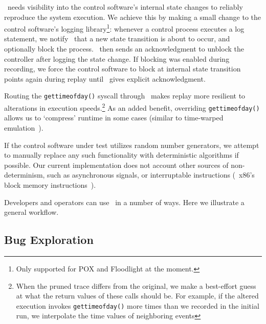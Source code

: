 \projectname~needs visibility into the control software's internal state
changes to reliably reproduce the system execution. We achieve this by
making a
small change to the control software's logging library\footnote{Only supported
for POX and Floodlight at the moment.}: whenever a control process executes a log
statement, we notify \projectname~that a new state transition
is about to occur, and optionally block the process. \projectname~then sends
an acknowledgment to unblock the controller after logging the state change. If blocking was enabled
during recording, we force the control software to block at internal state
transition points again during replay
until \projectname~gives explicit acknowledgment.

Routing the {\tt gettimeofday()} syscall
through \projectname~makes replay more resilient to alterations in execution
speeds.\footnote{When the pruned trace differs from the original, we make a
best-effort guess at what the return values of these calls should be. For example,
if the altered execution invokes {\tt gettimeofday()} more times than we recorded
in the initial run, we interpolate the time values of neighboring events}
As an added benefit, overriding {\tt gettimeofday()} allows us to `compress'
runtime in some cases (similar to time-warped emulation~\cite{Gupta06toinfinity}).

If the control software under test utilizes random number generators, we
attempt to manually replace any such functionality with deterministic
algorithms if possible. Our current implementation does not account other sources of non-determinism,
such as asynchronous signals,
or interruptable instructions (\eg~x86's block memory
instructions~\cite{Dunlap:2002:REI:844128.844148}).


Developers and operators can use \projectname~in a number of ways. Here we
illustrate a general workflow.

\subsection{Bug Exploration}
\label{subsec:exploration}

